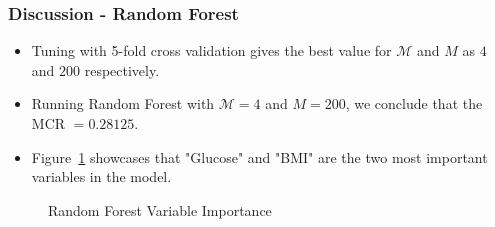 \documentclass{beamer}
\begin{document}
\begin{frame}
    \frametitle{Discussion - Random Forest}
        \begin{itemize}
            \setlength\itemsep{1em}
            \item Tuning with 5-fold cross validation gives the best value for $\mathcal{M}$ and $M$ as $4$ and $200$ respectively.
            \vspace{-0.2cm} %
            \item Running Random Forest with $\mathcal{M} = 4$ and $M = 200$, we conclude that the MCR $ = 0.28125.$
            \vspace{-0.2cm} %
            \item Figure~\ref{fig:RFPlot} showcases that "Glucose" and "BMI" are the two most important variables in the model.
        \end{itemize}
        \begin{figure}[h!]
            \centering
            \caption{Random Forest Variable Importance} 
            \label{fig:RFPlot}
        \end{figure}
\end{frame}
\end{document}
